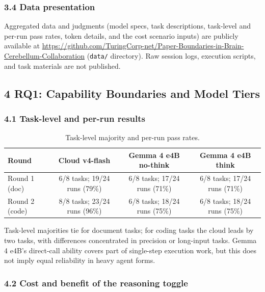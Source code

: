 \documentclass[
]{article}
\begin{document}
\subsubsection{3.4 Data presentation}
Aggregated data and judgments (model specs, task descriptions, task-level and per-run pass rates, token details, and the cost scenario inputs) are publicly available at \url{https://github.com/TuringCorp-net/Paper-Boundaries-in-Brain-Cerebellum-Collaboration} (\texttt{data/} directory). Raw session logs, execution scripts, and task materials are not published.

\subsection{4 RQ1: Capability Boundaries and Model Tiers}
\subsubsection{4.1 Task-level and per-run results}
\begin{table}[ht]
\centering
\small
\begin{tabular}{lccc}
\toprule
Round & Cloud v4-flash & Gemma 4 e4B no-think & Gemma 4 e4B think \\
\midrule
Round 1 (doc) & 6/8 tasks; 19/24 runs (79\%) & 6/8 tasks; 17/24 runs (71\%) & 6/8 tasks; 17/24 runs (71\%) \\
Round 2 (code) & 8/8 tasks; 23/24 runs (96\%) & 6/8 tasks; 18/24 runs (75\%) & 6/8 tasks; 18/24 runs (75\%) \\
\bottomrule
\end{tabular}
\caption{Task-level majority and per-run pass rates.}
\label{tab:rq1}
\end{table}

Task-level majorities tie for document tasks; for coding tasks the cloud leads by two tasks, with differences concentrated in precision or long-input tasks. Gemma 4 e4B's direct-call ability covers part of single-step execution work, but this does not imply equal reliability in heavy agent forms.

\subsubsection{4.2 Cost and benefit of the reasoning toggle}
\begin{table}[ht]
\centering
\small
{}
\caption{Reasoning toggle: cost vs. task-level majority gain.}
\label{tab:think}
\end{table}
\end{document}
